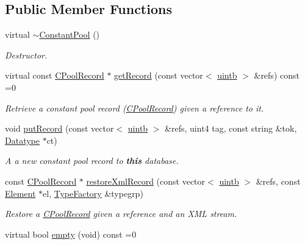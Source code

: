 \subsection*{Public Member Functions}
\begin{DoxyCompactItemize}
\item 
virtual \mbox{\hyperlink{class_constant_pool_a79f2065fd9ed9256d3b0eae79f1950e5}{$\sim$\+Constant\+Pool}} ()
\begin{DoxyCompactList}\small\item\em Destructor. \end{DoxyCompactList}\item 
virtual const \mbox{\hyperlink{class_c_pool_record}{C\+Pool\+Record}} $\ast$ \mbox{\hyperlink{class_constant_pool_ac17df35ff1376311f62912d29bf26cad}{get\+Record}} (const vector$<$ \mbox{\hyperlink{types_8h_a2db313c5d32a12b01d26ac9b3bca178f}{uintb}} $>$ \&refs) const =0
\begin{DoxyCompactList}\small\item\em Retrieve a constant pool record (\mbox{\hyperlink{class_c_pool_record}{C\+Pool\+Record}}) given a {\itshape reference} to it. \end{DoxyCompactList}\item 
void \mbox{\hyperlink{class_constant_pool_a004b94bca379a22b84d11b7299eabdd8}{put\+Record}} (const vector$<$ \mbox{\hyperlink{types_8h_a2db313c5d32a12b01d26ac9b3bca178f}{uintb}} $>$ \&refs, uint4 tag, const string \&tok, \mbox{\hyperlink{class_datatype}{Datatype}} $\ast$ct)
\begin{DoxyCompactList}\small\item\em A a new constant pool record to {\bfseries{this}} database. \end{DoxyCompactList}\item 
const \mbox{\hyperlink{class_c_pool_record}{C\+Pool\+Record}} $\ast$ \mbox{\hyperlink{class_constant_pool_a0d214988768d6bb90d2243018daec789}{restore\+Xml\+Record}} (const vector$<$ \mbox{\hyperlink{types_8h_a2db313c5d32a12b01d26ac9b3bca178f}{uintb}} $>$ \&refs, const \mbox{\hyperlink{class_element}{Element}} $\ast$el, \mbox{\hyperlink{class_type_factory}{Type\+Factory}} \&typegrp)
\begin{DoxyCompactList}\small\item\em Restore a \mbox{\hyperlink{class_c_pool_record}{C\+Pool\+Record}} given a {\itshape reference} and an X\+ML stream. \end{DoxyCompactList}\item 
virtual bool \mbox{\hyperlink{class_constant_pool_a22bef84ddc137d871c05a55c5757a3e1}{empty}} (void) const =0

\end{DoxyCompactItemize}
